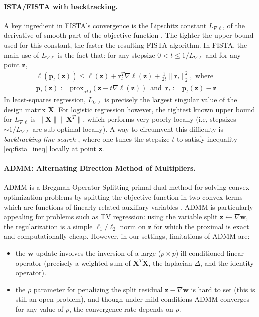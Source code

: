 \paragraph{ISTA/FISTA with backtracking.}
A key ingredient in FISTA's convergence is the Lipschitz
constant $L_{\nabla \ell}$, of the derivative of smooth part of the objective function
. The tighter the upper bound used for this constant,
the faster the resulting FISTA algorithm. In FISTA, the main use of 
$L_{\nabla \ell}$ is the fact that: for any
stepsize $0 < t \le 1/L_{\nabla \ell}$ and for any point $\mathbf{z}$,
\begin{equation}%
  \begin{gathered}
    \ell(\mathbf{p}_{t}(\mathbf{z})) \le
    \ell(\mathbf{z}) + \mathbf{r}_{t}^T\nabla
    \ell(\mathbf{z}) + \frac{1}{2t} \|\mathbf{r}_{t}\|_{2}^2,
    \text{  where} \quad\\
    \mathbf{p}_{t}(\mathbf{z}) := \textrm{prox}_{\alpha t J}(\mathbf{z} - t
    \nabla \ell(\mathbf{z})) \,\text{  and  }\,
    \mathbf{r}_{t} :=
    \mathbf{p}_{t}(\mathbf{z}) - \mathbf{z} \quad
  \end{gathered}
  \label{eq:fista_ineq}
\end{equation}
In least-squares regression, $L_{\nabla \ell}$ is precisely the largest
singular value of the design matrix $\mathbf{X}$.
For logistic
regression however, the tightest known upper bound for
$L_{\nabla \ell}$ is $\|\mathbf{X}\|\|\mathbf{X}^T\|$,
which performs very poorly locally (i.e, stepsizes $\sim 1 / L_{\nabla \ell}$ are
sub-optimal locally). A way to circumvent this difficulty is
\emph{backtracking line search}  \citep{beck2009a}, where one tunes the
stepsize $t$ to satisfy inequality \eqref{eq:fista_ineq} locally at
point $\mathbf{z}$. 


\paragraph{ADMM: Alternating Direction Method of Multipliers.}
ADMM is a Bregman Operator Splitting primal-dual method for
solving convex-optimization problems by splitting the
objective function in two convex terms which are functions of linearly-related auxiliary variables
 \citep{boyd2010}.  ADMM is particularly appealing for problems such as TV
regression: using the variable split $\mathbf{z}
\leftarrow \nabla \mathbf{w}$, the regularization is a simple $\ell_{1}/\ell_2$
norm on $\mathbf{z}$ for which the proximal is exact and computationally
cheap. However, in our settings, limitations of ADMM are:
\begin{itemize}
\item the $\mathbf{w}$-update involves the inversion of a large ($p \times p$)
  ill-conditioned linear operator (precisely a weighted sum of
  $\mathbf{X}^T\mathbf{X}$, the laplacian $\Delta$, and the identity
  operator).
\item the $\rho$ parameter for penalizing the split
  residual $\mathbf{z} - \nabla \mathbf{w}$ is hard to set (this is still an
  open problem), and though under mild conditions ADMM
  converges for any value of $\rho$, the convergence rate depends
  on $\rho$.
\end{itemize}

